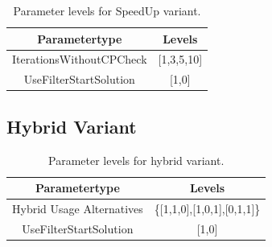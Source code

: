 \begin{table}[ht]
    \centering
    \begin{tabular}{c c }
        \toprule
        Parametertype            & Levels     \\
        \midrule
        IterationsWithoutCPCheck & [1,3,5,10] \\
        UseFilterStartSolution   & [1,0]      \\
        \bottomrule
    \end{tabular}
    \caption{Parameter levels for SpeedUp variant.}
    \label{tab:parameters_speedup}
\end{table}

\subsection{Hybrid Variant}
\label{subsec_parameterStuy_hybrid}

\begin{table}[ht]
    \centering
    \begin{tabular}{c c }
        \toprule
        Parametertype             & Levels                      \\
        \midrule
        Hybrid Usage Alternatives & \{[1,1,0],[1,0,1],[0,1,1]\} \\
        UseFilterStartSolution    & [1,0]                       \\
        \bottomrule
    \end{tabular}
    \caption{Parameter levels for hybrid variant.}
    \label{tab:parameters_hybrid}
\end{table}